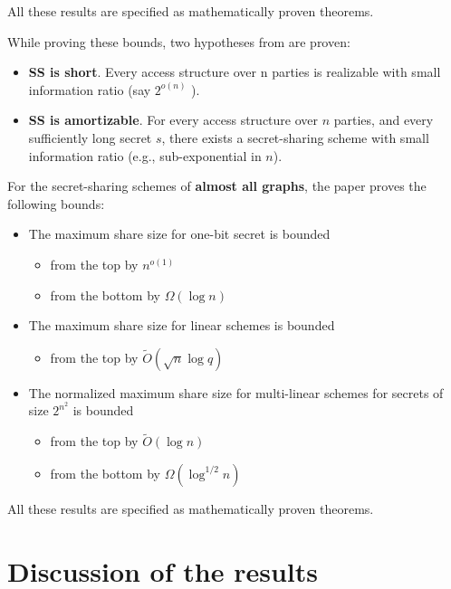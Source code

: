 All these results are specified as mathematically proven theorems.

While proving these bounds, two hypotheses from \cite{applebaumAmortization} are proven:

\begin{itemize}
    \item \textbf{SS is short}. Every access structure over n parties is realizable with small information ratio (say $2^{o(n)}$ ).
    \item \textbf{SS is amortizable}. For every access structure over $n$ parties, and every sufficiently long secret $s$, 
            there exists a secret-sharing scheme with small information ratio (e.g., sub-exponential in $n$).
\end{itemize}

For the secret-sharing schemes of \textbf{almost all graphs}, the paper proves the following bounds:

\begin{itemize}
    \item The maximum share size for one-bit secret is bounded 
    \begin{itemize}
        \item from the top by $n^{o(1)}$
        \item from the bottom by $\Omega(\log n)$
    \end{itemize}
    \item The maximum share size for linear schemes is bounded
    \begin{itemize}
        \item from the top by $\tilde{O}(\sqrt{n} \log q)$
    \end{itemize}
    \item The normalized maximum share size for multi-linear schemes for secrets of size $2^{n^2}$ is bounded
    \begin{itemize}
        \item from the top by $\tilde{O}(\log n)$
        \item from the bottom by $\Omega(\log^{1/2} n)$
    \end{itemize}
\end{itemize}

All these results are specified as mathematically proven theorems.

\section{Discussion of the results}

